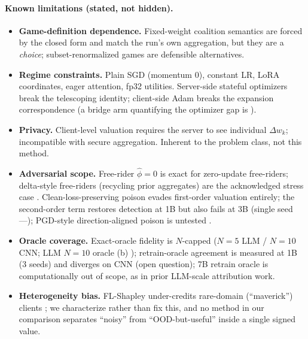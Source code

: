 \paragraph{Known limitations (stated, not hidden).}
\begin{itemize}[leftmargin=2em, itemsep=1pt]
\item \textbf{Game-definition dependence.} Fixed-weight coalition semantics are
forced by the closed form and match the run's own aggregation, but they are a
\emph{choice}; subset-renormalized games are defensible alternatives.
\item \textbf{Regime constraints.} Plain SGD (momentum 0), constant LR, LoRA
coordinates, eager attention, fp32 utilities. Server-side stateful optimizers
break the telescoping identity; client-side Adam breaks the expansion
correspondence (a bridge arm quantifying the optimizer gap is
).
\item \textbf{Privacy.} Client-level valuation requires the server to see
individual $\Delta w_k$; incompatible with secure aggregation. Inherent to the
problem class, not this method.
\item \textbf{Adversarial scope.} Free-rider $\hat\phi = 0$ is exact for
zero-update free-riders; delta-style free-riders (recycling prior aggregates)
are the acknowledged stress case . Clean-loss-preserving poison evades
first-order valuation entirely; the second-order term restores detection at 1B
but also fails at 3B (single seed---); PGD-style direction-aligned
poison is untested .
\item \textbf{Oracle coverage.} Exact-oracle fidelity is $N$-capped ($N{=}5$
LLM / $N{=}10$ CNN; LLM $N{=}10$ oracle (b) ); retrain-oracle
agreement is measured at 1B (3 seeds) and diverges on CNN (open question);
7B retrain oracle is computationally out of scope, as in prior LLM-scale
attribution work.
\item \textbf{Heterogeneity bias.} FL-Shapley under-credits rare-domain
(``maverick'') clients \citep{mavericks2024}; we characterize rather than fix
this, and no method in our comparison separates ``noisy'' from
``OOD-but-useful'' inside a single signed value.
\end{itemize}
